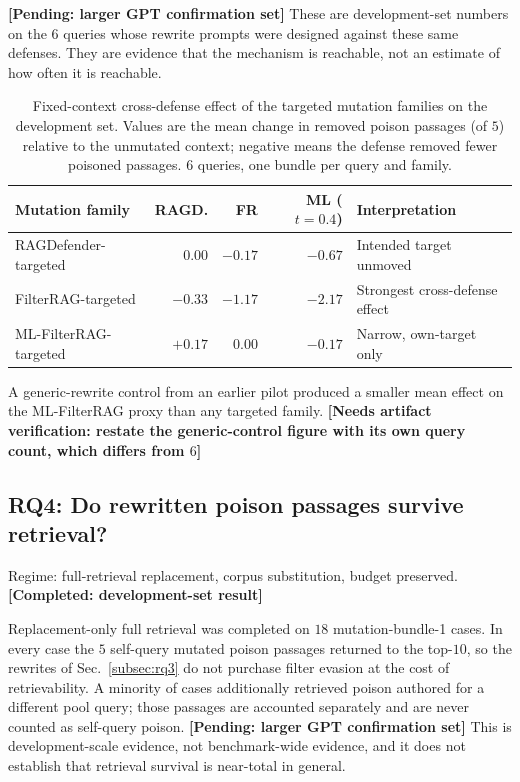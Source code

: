 \documentclass[conference]{IEEEtran}
\newcommand{\COMPLETED}[1]{\textbf{[Completed: #1]}}
\newcommand{\PENDING}[1]{\textbf{[Pending: #1]}}
\newcommand{\VERIFY}[1]{\textbf{[Needs artifact verification: #1]}}
\newcommand{\NdevQ}{6}           %
\newcommand{\NdevBundles}{18}    %
\newcommand{\Npoison}{5}         %
\newcommand{\Ktop}{10}           %
\newcommand{\mlthresh}{0.4}      %
\begin{document}
\PENDING{larger GPT confirmation set} These are development-set numbers on the
$\NdevQ$ queries whose rewrite prompts were designed against these same
defenses. They are evidence that the mechanism is reachable, not an estimate of
how often it is reachable.

\begin{table}[!t]
\centering
\caption{Fixed-context cross-defense effect of the targeted mutation families on
the development set. Values are the mean change in removed poison passages (of
$\Npoison$) relative to the unmutated context; negative means the defense removed
fewer poisoned passages. $\NdevQ$ queries, one bundle per query and family.}
\label{tab:targeted_mutation_fixed_context}
\scriptsize
\setlength{\tabcolsep}{3pt}
\renewcommand{\arraystretch}{1.05}
\begin{tabular}{@{}p{}rrrp{}@{}}
\toprule
Mutation family & RAGD. & FR & ML ($t{=}\mlthresh$) & Interpretation \\
\midrule
RAGDefender-targeted   & $0.00$  & $-0.17$ & $-0.67$ & Intended target unmoved \\
FilterRAG-targeted     & $-0.33$ & $-1.17$ & $-2.17$ & Strongest cross-defense effect \\
ML-FilterRAG-targeted  & $+0.17$ & $0.00$  & $-0.17$ & Narrow, own-target only \\
\bottomrule
\end{tabular}
\vspace{2pt}
{\scriptsize A generic-rewrite control from an earlier pilot produced a smaller
mean effect on the ML-FilterRAG proxy than any targeted family.
\VERIFY{restate the generic-control figure with its own query count, which
differs from $\NdevQ$}}
\end{table}

\subsection{RQ4: Do rewritten poison passages survive retrieval?}
\label{subsec:rq4}
Regime: full-retrieval replacement, corpus substitution, budget preserved.
\COMPLETED{development-set result}

Replacement-only full retrieval was completed on $\NdevBundles$
mutation-bundle-1 cases. In every case the $\Npoison$ self-query mutated poison
passages returned to the top-$\Ktop$, so the rewrites of
Sec.~\ref{subsec:rq3} do not purchase filter evasion at the cost of
retrievability. A minority of cases additionally retrieved poison authored for a
different pool query; those passages are accounted separately and are never
counted as self-query poison.
\PENDING{larger GPT confirmation set} This is development-scale evidence, not
benchmark-wide evidence, and it does not establish that retrieval survival is
near-total in general.
\end{document}
